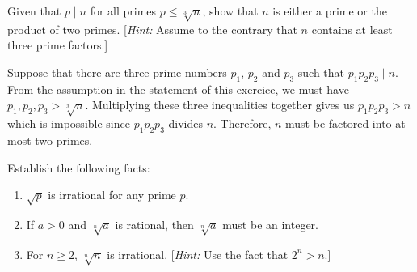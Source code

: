 \begin{exercise}
    Given that $p \mid n$ for all primes $p \leq \sqrt[3]{n}$, show that $n$ is either a prime or the product of two primes. [\textit{Hint:} Assume to the contrary that $n$ contains at least three prime factors.] \\
\end{exercise}

\begin{solution}
    Suppose that there are three prime numbers $p_1$, $p_2$ and $p_3$ such that $p_1p_2p_3 \mid n$. From the assumption in the statement of this exercice, we must have $p_1, p_2, p_3 > \sqrt[3]{n}$. Multiplying these three inequalities together gives us $p_1p_2p_3 > n$ which is impossible since $p_1p_2p_3$ divides $n$. Therefore, $n$ must be factored into at most two primes. \\
\end{solution}

\begin{exercise}
    Establish the following facts:
    \begin{enumerate}
        \item $\sqrt{p}$ is irrational for any prime $p$.
        \item If $a > 0$ and $\sqrt[n]{a}$ is rational, then $\sqrt[n]{a}$ must be an integer.
        \item For $n \geq 2$, $\sqrt[n]{n}$ is irrational. [\textit{Hint:} Use the fact that $2^n > n$.]
    \end{enumerate}
\end{exercise}

